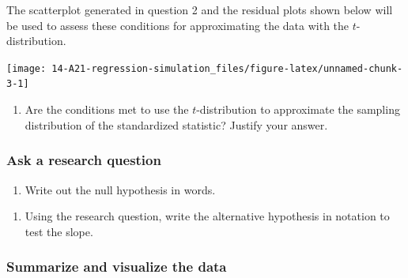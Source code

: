 \documentclass[
]{report}
\providecommand{\tightlist}{%
  \setlength{\itemsep}{0pt}\setlength{\parskip}{0pt}}
\begin{document}
The scatterplot generated in question 2 and the residual plots shown below will be used to assess these conditions for approximating the data with the \(t\)-distribution.

\begin{center}\texttt{[image: 14-A21-regression-simulation\_files/figure-latex/unnamed-chunk-3-1]} \end{center}

\begin{enumerate}
\def\labelenumi{\arabic{enumi}.}
\setcounter{enumi}{4}
\tightlist
\item
  Are the conditions met to use the \(t\)-distribution to approximate the sampling distribution of the standardized statistic? Justify your answer.
\end{enumerate}

\vspace{1.5in}

\hypertarget{ask-a-research-question-4}{%
\subsubsection*{Ask a research question}\label{ask-a-research-question-4}}

\begin{enumerate}
\def\labelenumi{\arabic{enumi}.}
\setcounter{enumi}{5}
\tightlist
\item
  Write out the null hypothesis in words.
\end{enumerate}

\vspace{1in}

\begin{enumerate}
\def\labelenumi{\arabic{enumi}.}
\setcounter{enumi}{6}
\tightlist
\item
  Using the research question, write the alternative hypothesis in notation to test the slope.
\end{enumerate}

\vspace{0.5in}

\hypertarget{summarize-and-visualize-the-data-4}{%
\subsubsection*{Summarize and visualize the data}\label{summarize-and-visualize-the-data-4}}
\end{document}
